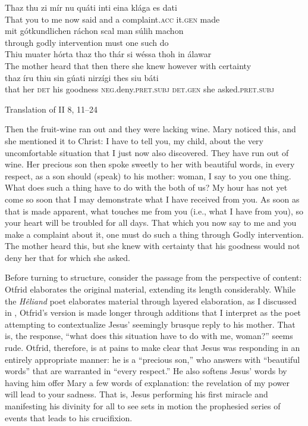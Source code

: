 \gll     Thaz  thu  zi mír  nu   quáti     inti eina klága     es     dati \\
  That   you  to me   now   said   and a complaint.\textsc{acc}  it.\textsc{gen}  made  \\

\gll mit gótkundlichen ráchon  scal    man  súlih  machon\\
through godly intervention  must  one   such  do\\

\gll Thiu muater   hórta   thaz  tho  thár      si  wéssa   thoh   in   álawar\\
The mother  heard  that  then  there  she   knew  however   with  certainty\\

\gll thaz íru  thiu sin gúati    nirzígi         thes    siu  báti\\
that  her   \textsc{det} his goodness   \textsc{neg}.deny.\textsc{pret.subj}  \textsc{det.gen}  she   asked.\textsc{pret.subj}\\
    \z

\ea%
    \label{ex:7:11}
Translation of II 8, 11--24

Then the fruit-wine ran out and they were lacking wine. Mary noticed this, and she mentioned it to Christ: I have to tell you, my child, about the very uncomfortable situation that I just now also discovered. They have run out of wine. Her precious son then spoke sweetly to her with beautiful words, in every respect, as a son should (speak) to his mother: woman, I say to you one thing. What does such a thing have to do with the both of us? My hour has not yet come so soon that I may demonstrate what I have received from you. As soon as that is made apparent, what touches me from you (i.e., what I have from you), so your heart will be troubled for all days. That which you now say to me and you make a complaint about it, one must do such a thing through Godly intervention. The mother heard this, but she knew with certainty that his goodness would not deny her that for which she asked.
    \z

\noindent Before turning to structure, consider the passage from the perspective of content: Otfrid elaborates the original material, extending its length considerably. While the \textit{Hêliand} poet elaborates material through layered elaboration, as I discussed in , Otfrid’s version is made longer through additions that I interpret as the poet attempting to contextualize Jesus’ seemingly brusque reply to his mother. That is, the response, “what does this situation have to do with me, woman?” seems rude. Otfrid, therefore, is at pains to make clear that Jesus was responding in an entirely appropriate manner: he is a “precious son,” who answers with “beautiful words” that are warranted in “every respect.” He also softens Jesus’ words by having him offer Mary a few words of explanation: the revelation of my power will lead to your sadness. That is, Jesus performing his first miracle and manifesting his divinity for all to see sets in motion the prophesied series of events that leads to his crucifixion.

